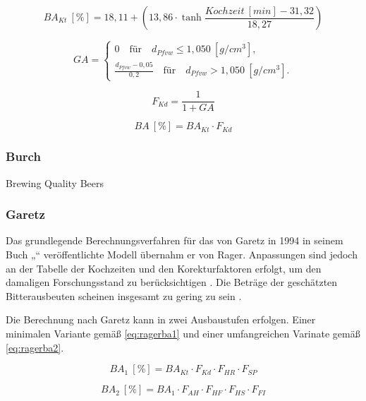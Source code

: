 \documentclass[a4paper,parskip=half]{scrartcl}
\newcommand{\BA}{\mathit{BA}}
\newcommand{\BAKt}{{\mathit{BA}}_{\mathit{Kt}}}
\newcommand{\umin}{\:[\mathit{min}]}
\newcommand{\uden}{\:[\mathit{g/cm^3}]}
\newcommand{\uper}{\:[\%]}
\newcommand{\FKd}{F_{\mathit{Kd}}}
\newcommand{\FHR}{F_{\mathit{HR}}}
\newcommand{\FSP}{F_{\mathit{SP}}}
\newcommand{\FAH}{F_{\mathit{AH}}}
\newcommand{\FHF}{F_{\mathit{HF}}}
\newcommand{\FHS}{F_{\mathit{HS}}}
\newcommand{\FFil}{F_{\mathit{FI}}}
\begin{document}
\begin{equation}
\BAKt \uper = 18,11 + \left(13,86 \cdot \tanh{\frac{\mathit{Kochzeit} \umin - 31,32}{18,27}}\right)
\label{eq:ragerbakt}
\end{equation}


\begin{equation}
\mathit{GA} = \begin{cases}
0 \quad \text{für} \quad d_{\mathit{Pfvw}} \le 1,050 \uden, \\
\frac{d_{\mathit{Pfvw}} - 0,05}{0,2} \quad \text{für} \quad d_{\mathit{Pfvw}} > 1,050 \uden.
\end{cases}
\label{eq:ragerga}
\end{equation}

\begin{equation}
\FKd = \frac{1}{1 + GA}
\label{eq:ragerfkd}
\end{equation}


\begin{equation}
\BA \uper = \BAKt \cdot \FKd
\label{eq:ragerba}
\end{equation}

\subsubsection*{Burch}
Brewing Quality Beers

\subsubsection*{Garetz}

Das grundlegende Berechnungsverfahren für das von Garetz in 1994 in seinem
Buch „“ veröffentlichte Modell übernahm er
von Rager. Anpassungen sind jedoch an der Tabelle der Kochzeiten und den
Korekturfaktoren erfolgt, um den damaligen Forschungsstand zu berücksichtigen
\parencite[134-144]{Garetz1994}. Die Beträge der geschätzten
Bitterausbeuten scheinen insgesamt zu gering zu sein \parencite{Jones1995}.

Die Berechnung nach Garetz kann in zwei Ausbaustufen erfolgen. Einer minimalen
Variante gemäß \autoref{eq:ragerba1} und einer umfangreichen Varinate gemäß
\autoref{eq:ragerba2}. 

\begin{equation}
\BA_1 \uper = \BAKt \cdot \FKd \cdot \FHR \cdot \FSP
\label{eq:ragerba1}
\end{equation}

\begin{equation}
\BA_2 \uper = BA_1 \cdot \FAH \cdot \FHF \cdot \FHS \cdot \FFil
\label{eq:ragerba2}
\end{equation}
\end{document}
